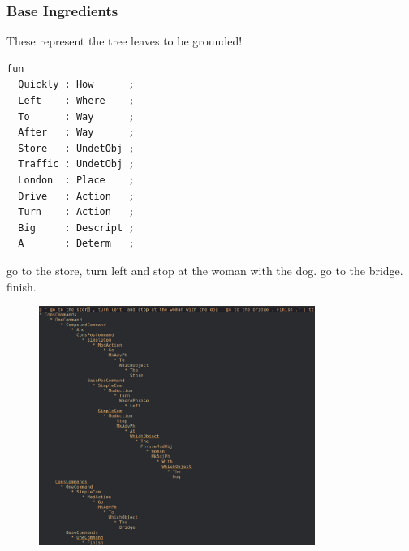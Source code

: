 \documentclass{beamer}
\begin{document}
\begin{frame}[fragile]
\frametitle{Base Ingredients}

\begin{exampleblock}{}
These represent the tree leaves to be grounded!
\end{exampleblock}

\begin{verbatim}
fun
  Quickly : How      ;
  Left    : Where    ;
  To      : Way      ;
  After   : Way      ;
  Store   : UndetObj ;
  Traffic : UndetObj ;
  London  : Place    ;
  Drive   : Action   ;
  Turn    : Action   ;
  Big     : Descript ;
  A       : Determ   ;
\end{verbatim}
\end{frame}


\begin{frame}
\fontsize{9pt}{10pt}\selectfont
\begin{exampleblock}{}
go to the store, turn left and stop at the woman with the dog. go to the bridge. finish.
\end{exampleblock}

\begin{figure}

\centering
\includegraphics[width=90mm]{pics/wholeAST.png}
\end{figure}
\end{frame}
\end{document}
